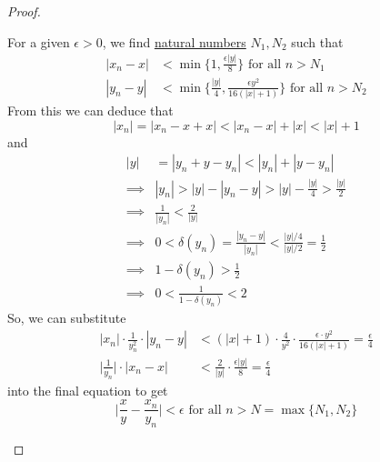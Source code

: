 \begin{proof}
\begin{enumerate}
      For a given $\epsilon > 0$, we find \hyperref[st-def:naturals]{natural numbers} $N_1, N_2$ such that 
      \begin{align}
        |x_n - x| & < \min\Big\{ 1, \frac{\epsilon|y|}{8} \Big\} \text{ for all } n > N_1 \\
        |y_n - y| & < \min \Big\{ \frac{|y|}{4}, \frac{\epsilon y^2}{16(|x| + 1)} \Big\} \text{ for all } n > N_2 
      \end{align}
      From this we can deduce that 
      \begin{equation}
        |x_n| = |x_n - x + x| < |x_n - x| + |x| < |x| + 1
      \end{equation}
      and
      \begin{align}
        |y| & = |y_n + y - y_n| < |y_n| + |y - y_n| \\
        \implies & |y_n| > |y| - |y_n - y| > |y| - \frac{|y|}{4} > \frac{|y|}{2} \\
        \implies & \frac{1}{|y_n|} < \frac{2}{|y|} \\
        \implies & 0 < \delta(y_n) = \frac{|y_n - y|}{|y_n|} < \frac{|y|/4}{|y|/2} = \frac{1}{2} \\
        \implies & 1 - \delta(y_n) > \frac{1}{2}\\
        \implies & 0 < \frac{1}{1 - \delta(y_n)} < 2
      \end{align}
      So, we can substitute 
      \begin{align}
        |x_n| \cdot \frac{1}{y_n^2} \cdot |y_n - y| & < (|x| + 1) \cdot \frac{4}{y^2} \cdot \frac{\epsilon \cdot y^2}{16(|x|+1)} = \frac{\epsilon}{4} \\
        \bigg|\frac{1}{y_n} \bigg| \cdot |x_n - x| & < \frac{2}{|y|} \cdot \frac{\epsilon |y|}{8} = \frac{\epsilon}{4} 
      \end{align}
      into the final equation to get
      \begin{equation}
        \bigg| \frac{x}{y} - \frac{x_n}{y_n}\bigg| < \epsilon \text{ for all } n > N= \max\{N_1, N_2\}
      \end{equation}
    \end{enumerate}
  \end{proof}

